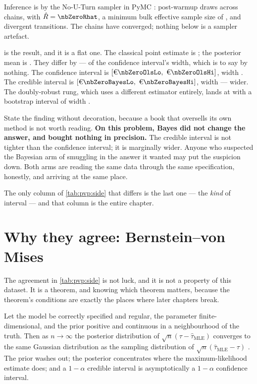 Inference is by the No-U-Turn sampler \citep{hoffman2014} in PyMC \citep{salvatier2016}:
\nbZeroNDraws{} post-warmup draws across \nbZeroNChains{} chains, with $\hat R =
\nbZeroRhat$, a minimum bulk effective sample size of \nbZeroEss{} \citep{vehtari2021}, and
\nbZeroDivergences{} divergent transitions. The chains have converged; nothing below is a
sampler artefact.



 is the result, and it is a flat one. The classical point estimate is
\eur{\nbZeroOlsEst}; the posterior mean is \eur{\nbZeroBayesMean}. They differ by
\eur{\nbZeroEstGap} --- \pc{\nbZeroEstGapPct} of the confidence interval's width, which is to say
by nothing. The confidence interval is $[\eur{\nbZeroOlsLo},\ \eur{\nbZeroOlsHi}]$, width
\eur{\nbZeroOlsWidth}. The credible interval is $[\eur{\nbZeroBayesLo},\ \eur{\nbZeroBayesHi}]$,
width \eur{\nbZeroBayesWidth} --- \pc{\nbZeroWidthRatioPct} wider. The doubly-robust rung, which
uses a different estimator entirely, lands at \eur{\nbZeroAipwEst} with a bootstrap interval of
width \eur{\nbZeroAipwWidth}.

State the finding without decoration, because a book that oversells its own method is not worth
reading. \textbf{On this problem, Bayes did not change the answer, and bought nothing in
precision.} The credible interval is not tighter than the confidence interval; it is marginally
wider. Anyone who suspected the Bayesian arm of smuggling in the answer it wanted may put the
suspicion down. Both arms are reading the same data through the same specification, honestly, and
arriving at the same place.

The only column of \cref{tab:pvp:side} that differs is the last one --- the \emph{kind} of
interval --- and that column is the entire chapter.

\section{Why they agree: Bernstein--von Mises}
\label{sec:pvp:bvm}

The agreement in \cref{tab:pvp:side} is not luck, and it is not a property of this dataset. It is
a theorem, and knowing which theorem matters, because the theorem's conditions are exactly the
places where later chapters break.

\begin{proposition}\label{prop:pvp:bvm}
Let the model be correctly specified and regular, the parameter finite-dimensional, and the prior
positive and continuous in a neighbourhood of the truth. Then as $n \to \infty$ the posterior
distribution of $\sqrt{n}(\tau - \hat\tau_{\text{MLE}})$ converges to the same Gaussian
distribution as the sampling distribution of $\sqrt{n}(\hat\tau_{\text{MLE}} - \tau)$
\citep[Ch.~10]{vandervaart1998}. The prior washes out; the posterior concentrates where the
maximum-likelihood estimate does; and a $1-\alpha$ credible interval is asymptotically a
$1-\alpha$ confidence interval.
\end{proposition}

